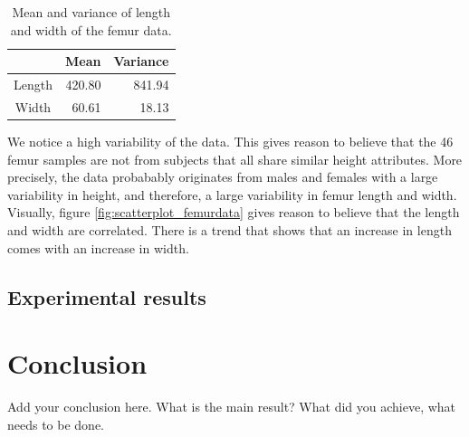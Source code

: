 \documentclass[10pt]{article}
\begin{document}
\begin{table}[h!]
\centering
\begin{tabular}{c|r|r}
 & Mean & Variance \\
\hline
Length & 420.80 & 841.94 \\
Width & 60.61 & 18.13
\end{tabular}
\caption{Mean and variance of length and width of the femur data.}
\label{table:mean_variance_femur_data}
\end{table}

\noindent
We notice a high variability of the data. This gives reason to believe that the 46 femur samples are not from subjects that all share similar height attributes. More precisely, the data probabably originates from males and females with a large variability in height, and therefore, a large variability in femur length and width. Visually, figure \ref{fig:scatterplot_femurdata} gives reason to believe that the length and width are correlated. There is a trend that shows that an increase in length comes with an increase in width.





\newpage
\subsection{Experimental results}

\newpage
\section{Conclusion}

Add your conclusion here. What is the main result? What did you achieve, what 
needs to be done. 
\end{document}
